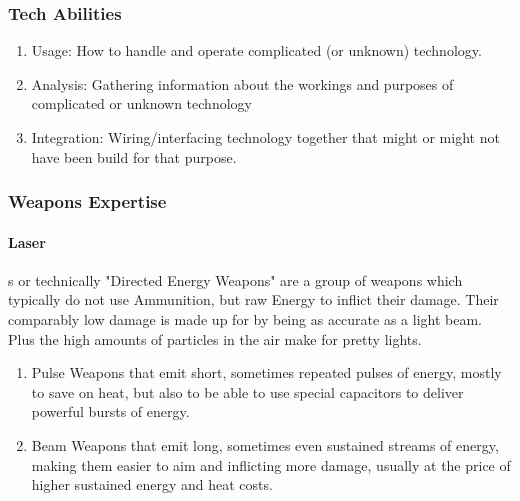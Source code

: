 \documentclass{article}
\begin{document}
    \subsubsection{Tech Abilities}
        \begin{enumerate}[label= -]
            \item {Usage}: How to handle and operate complicated (or unknown) technology.
            \item {Analysis}: Gathering information about the workings and purposes of complicated or unknown technology
            \item {Integration}: Wiring/interfacing technology together that might or might not have been build for
            that purpose.
        \end{enumerate}
        \subsubsection{Weapons Expertise}
        \paragraph{Laser}s or technically "Directed Energy Weapons" \newline are a group of weapons which typically
    do not use Ammunition, but raw Energy to inflict their damage. Their comparably low damage is made up for by being
    as accurate as a light beam. Plus the high amounts of particles in the air make for pretty lights.
        \begin{enumerate}[label= -]
            \item {Pulse} Weapons that emit short, sometimes repeated pulses of energy, mostly to save on heat, but also
            to be able to use special capacitors to deliver powerful bursts of energy.
            \item {Beam} Weapons that emit long, sometimes even sustained streams of energy, making them easier to aim
            and inflicting more damage, usually at the price of higher sustained energy and heat costs.
        \end{enumerate}
\end{document}
